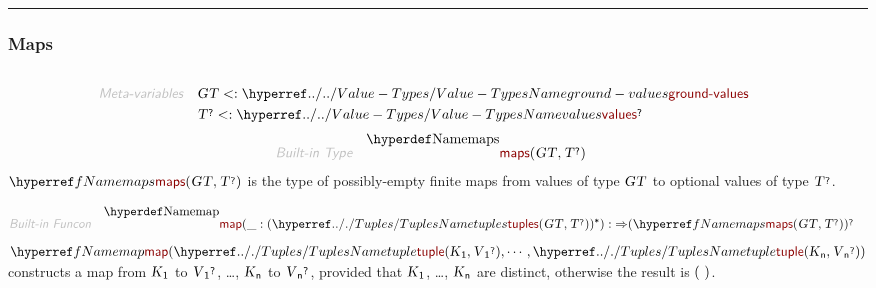 

\begin{center}
\rule{3in}{0.4pt}
\end{center}

\subsubsection{Maps}\hypertarget{maps}{}\label{maps}

\begin{align*}
  [ \
  \KEY{Type} \quad & \NAMEREF{maps} \\
  \KEY{Funcon} \quad & \NAMEREF{map} \\
  \KEY{Funcon} \quad & \NAMEREF{map-elements} \\
  \KEY{Funcon} \quad & \NAMEREF{map-lookup} \\
  \KEY{Alias} \quad & \NAMEREF{lookup} \\
  \KEY{Funcon} \quad & \NAMEREF{map-domain} \\
  \KEY{Alias} \quad & \NAMEREF{dom} \\
  \KEY{Funcon} \quad & \NAMEREF{map-override} \\
  \KEY{Funcon} \quad & \NAMEREF{map-unite} \\
  \KEY{Funcon} \quad & \NAMEREF{map-delete}
  \ ]
\end{align*}
\begin{align*}
  \KEY{Meta-variables} \quad
  & \VAR{GT} <: \NAMEHYPER{../..}{Value-Types}{ground-values} \qquad \\& \VAR{T}\QUERY <: \NAMEHYPER{../..}{Value-Types}{values}\QUERY
\end{align*}
\begin{align*}
  \KEY{Built-in Type} \quad 
  & \NAMEDECL{maps}(
                       \VAR{GT} , \VAR{T}\QUERY )  
\end{align*}
$\SHADE{\NAMEREF{maps}
           (  \VAR{GT}, 
                  \VAR{T}\QUERY )}$ is the type of possibly-empty finite maps from values of 
  type $\SHADE{\VAR{GT}}$ to optional values of type $\SHADE{\VAR{T}\QUERY}$.

\begin{align*}
  \KEY{Built-in Funcon} \quad
  & \NAMEDECL{map}(
                       \_ : (  \NAMEHYPER{../.}{Tuples}{tuples}
                                       (  \VAR{GT}, 
                                              \VAR{T}\QUERY ) )\STAR) 
    :  \TO (  \NAMEREF{maps}
                           (  \VAR{GT}, 
                                  \VAR{T}\QUERY ) )\QUERY 
\end{align*}
$\SHADE{\NAMEREF{map}
           (  \NAMEHYPER{../.}{Tuples}{tuple}
                   (  \VAR{K}\SUB{1}, 
                          \VAR{V}\SUB{1}\QUERY ), 
                  \cdots, 
                  \NAMEHYPER{../.}{Tuples}{tuple}
                   (  \VAR{K}\SUB{n}, 
                          \VAR{V}\SUB{n}\QUERY ) )}$ constructs a map from 
  $\SHADE{\VAR{K}\SUB{1}}$ to $\SHADE{\VAR{V}\SUB{1}\QUERY}$, \ldots{}, $\SHADE{\VAR{K}\SUB{n}}$ to $\SHADE{\VAR{V}\SUB{n}\QUERY}$, provided that $\SHADE{\VAR{K}\SUB{1}}$, \ldots{}, $\SHADE{\VAR{K}\SUB{n}}$
  are distinct, otherwise the result is $\strut(   \  )\strut$.


